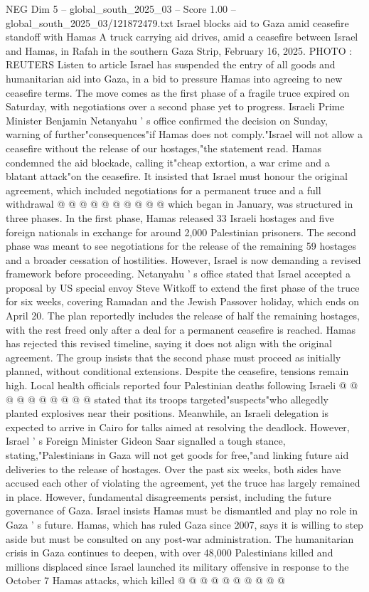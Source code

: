 \begin{textsample}{NEG Dim 5 – global\_south\_2025\_03 – Score 1.00 – global\_south\_2025\_03/121872479.txt}  \label{ex:f5_neg_268}
Israel blocks aid to Gaza amid ceasefire standoff with Hamas A truck carrying aid drives, amid a ceasefire between Israel and Hamas, in Rafah in the southern Gaza Strip, February 16, 2025.
PHOTO : REUTERS Listen to article Israel has suspended the entry of all goods and humanitarian aid into Gaza, in a bid to pressure Hamas into agreeing to new ceasefire terms.
The move comes as the first phase of a fragile truce expired on Saturday, with negotiations over a second phase yet to progress.
Israeli Prime Minister Benjamin Netanyahu ' s office confirmed the decision on Sunday, warning of further"consequences"if Hamas does not comply."Israel will not allow a ceasefire without the release of our hostages,"the statement read.
Hamas condemned the aid blockade, calling it"cheap extortion, a war crime and a blatant attack"on the ceasefire.
It insisted that Israel must honour the original agreement, which included negotiations for a permanent truce and a full withdrawal @ @ @ @ @ @ @ @ @ @ which began in January, was structured in three phases.
In the first phase, Hamas released 33 Israeli hostages and five foreign nationals in exchange for around 2,000 Palestinian prisoners.
The second phase was meant to see negotiations for the release of the remaining 59 hostages and a broader cessation of hostilities.
However, Israel is now demanding a revised framework before proceeding.
Netanyahu ' s office stated that Israel accepted a proposal by US special envoy Steve Witkoff to extend the first phase of the truce for six weeks, covering Ramadan and the Jewish Passover holiday, which ends on April 20.
The plan reportedly includes the release of half the remaining hostages, with the rest freed only after a deal for a permanent ceasefire is reached.
Hamas has rejected this revised timeline, saying it does not align with the original agreement.
The group insists that the second phase must proceed as initially planned, without conditional extensions.
Despite the ceasefire, tensions remain high.
Local health officials reported four Palestinian deaths following Israeli @ @ @ @ @ @ @ @ @ @ stated that its troops targeted"suspects"who allegedly planted explosives near their positions.
Meanwhile, an Israeli delegation is expected to arrive in Cairo for talks aimed at resolving the deadlock.
However, Israel ' s Foreign Minister Gideon Saar signalled a tough stance, stating,"Palestinians in Gaza will not get goods for free,"and linking future aid deliveries to the release of hostages.
Over the past six weeks, both sides have accused each other of violating the agreement, yet the truce has largely remained in place.
However, fundamental disagreements persist, including the future governance of Gaza.
Israel insists Hamas must be dismantled and play no role in Gaza ' s future.
Hamas, which has ruled Gaza since 2007, says it is willing to step aside but must be consulted on any post-war administration.
The humanitarian crisis in Gaza continues to deepen, with over 48,000 Palestinians killed and millions displaced since Israel launched its military offensive in response to the October 7 Hamas attacks, which killed @ @ @ @ @ @ @ @ @ @

\end{textsample}
